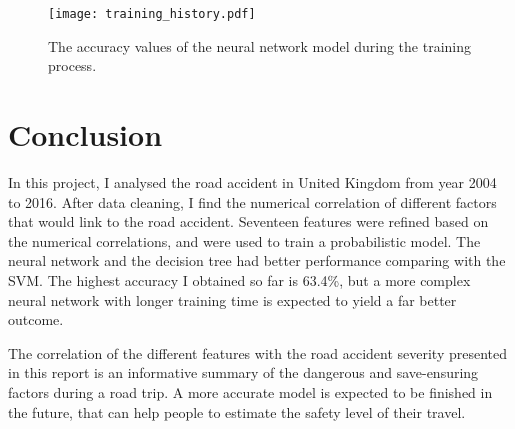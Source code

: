 \documentclass[12pt,a4paper]{article}
\begin{document}
\begin{figure}[!ht]
    \centering
    \texttt{[image: training\_history.pdf]}
    \caption{The accuracy values of the neural network model during the training process.}
    \label{figNN}
\end{figure}

\section{Conclusion}

In this project, I analysed the road accident in United Kingdom from year 2004 to 2016. After data cleaning, I find the numerical correlation of different factors that would link to the road accident. Seventeen features were refined based on the numerical correlations, and were used to train a probabilistic model. The neural network and the decision tree had better performance comparing with the SVM. The highest accuracy I obtained so far is 63.4\%, but a more complex neural network with longer training time is expected to yield a far better outcome.

The correlation of the different features with the road accident severity presented in this report is an informative summary of the dangerous and save-ensuring factors during a road trip. A more accurate model is expected to be finished in the future, that can help people to estimate the safety level of their travel.
\end{document}
